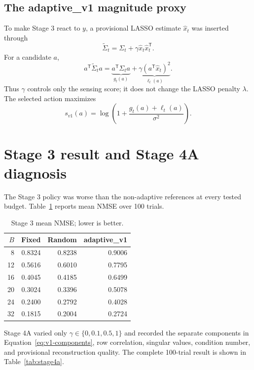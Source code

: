 \documentclass[11pt,a4paper]{article}
\newcommand{\trans}{^{\mathsf T}}
\begin{document}
\subsection{The adaptive\_v1 magnitude proxy}

To make Stage 3 react to $y$, a provisional LASSO estimate $\hat{x}_t$ was inserted through
\begin{equation}
\widetilde{\Sigma}_t
=\Sigma_t+\gamma\hat{x}_t\hat{x}_t\trans .
\label{eq:v1-covariance}
\end{equation}
For a candidate $a$,
\begin{equation}
a\trans\widetilde{\Sigma}_ta
=\underbrace{a\trans\Sigma_ta}_{g_t(a)}
+\underbrace{\gamma(a\trans\hat{x}_t)^2}_{\ell_t(a)} .
\label{eq:v1-components}
\end{equation}
Thus $\gamma$ controls only the sensing score; it does not change the LASSO penalty
$\lambda$.  The selected action maximizes
\begin{equation}
s_{v1}(a)=\log\!\left(1+\frac{g_t(a)+\ell_t(a)}{\sigma^2}\right).
\label{eq:v1-score}
\end{equation}

\section{Stage 3 result and Stage 4A diagnosis}

The Stage 3 policy was worse than the non-adaptive references at every tested budget.
Table~\ref{tab:stage3} reports mean NMSE over 100 trials.

\begin{table}[htbp]
\centering
\caption{Stage 3 mean NMSE; lower is better.}
\label{tab:stage3}
\begin{tabular}{rrrr}
\hline
$B$ & Fixed & Random & adaptive\_v1 \\
\hline
8  & 0.8324 & 0.8238 & 0.9006 \\
12 & 0.5616 & 0.6010 & 0.7795 \\
16 & 0.4045 & 0.4185 & 0.6499 \\
20 & 0.3024 & 0.3396 & 0.5078 \\
24 & 0.2400 & 0.2792 & 0.4028 \\
32 & 0.1815 & 0.2004 & 0.2724 \\
\hline
\end{tabular}
\end{table}

Stage 4A varied only $\gamma\in\{0,0.1,0.5,1\}$ and recorded the separate components in
Equation~\eqref{eq:v1-components}, row correlation, singular values, condition number, and
provisional reconstruction quality.  The complete 100-trial result is shown in
Table~\ref{tab:stage4a}.
\end{document}
